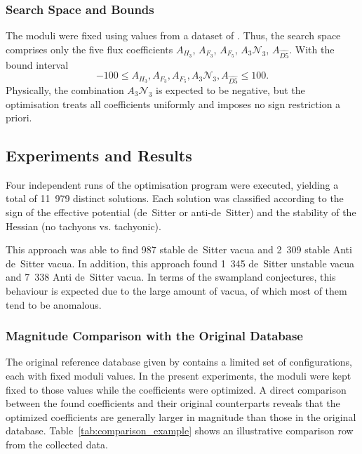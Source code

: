 \documentclass[runningheads]{llncs}
\begin{document}
\subsubsection{Search Space and Bounds}
The moduli were fixed using values from a dataset of \cite{Damian2022}.
Thus, the search space comprises only the five flux coefficients
\(A_{H_3}\), \(A_{F_3}\), \(A_{F_5}\), \(A_3\mathcal{N}_3\), \(A_{\widehat{D5}}\).
With the bound interval
\[
-100 \le A_{H_3}, A_{F_3}, A_{F_5}, A_3\mathcal{N}_3, A_{\widehat{D5}} \le 100.
\]
Physically, the combination \(A_3\mathcal{N}_3\) is expected to be
negative, but the optimisation treats all coefficients uniformly
and imposes no sign restriction a priori.

\subsection{Experiments and Results}

Four independent runs of the optimisation program were executed,
yielding a total of 11~979 distinct solutions. Each solution
was classified according to the sign of the effective potential
(de~Sitter or anti‑de~Sitter) and the stability of the Hessian
(no tachyons vs. tachyonic).

This approach was able to find 987 stable de~Sitter vacua
and 2~309 stable Anti de~Sitter vacua. In addition, this approach
found 1~345 de~Sitter unstable vacua and 7~338 Anti de~Sitter
vacua. In terms of the swampland conjectures, this behaviour
is expected due to the large amount of vacua, of which most
of them tend to be anomalous.

\subsubsection{Magnitude Comparison with the Original Database}

The original reference database given by \cite{Damian2022} contains a
limited set of configurations, each with fixed moduli values.
In the present experiments, the moduli were kept fixed to those
values while the coefficients were optimized. A direct
comparison between the found coefficients and their original
counterparts reveals that the optimized coefficients are
generally larger in magnitude than those in the original
database. Table~\ref{tab:comparison_example} shows an
illustrative comparison row from the collected data.
\end{document}
